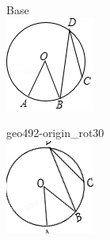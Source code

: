 \documentclass[12pt]{article}
\begin{document}
\begin{center}
\begin{minipage}{0.32\textwidth}\centering
Base\\
\includegraphics[width=0.95\linewidth]{out_rommath_origin/items/geo492-origin/assets/figure.png}
\end{minipage}
\hfill\begin{minipage}{0.32\textwidth}\centering
geo492-origin\_rot30\\
\includegraphics[width=0.95\linewidth]{out_rommath_origin/items/geo492-origin/assets/figure_rot30.png}

\end{minipage}
\end{center}
\end{document}
